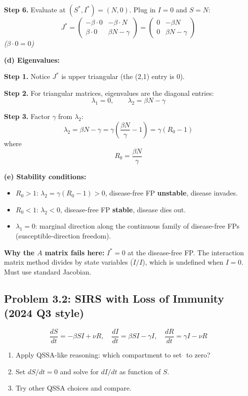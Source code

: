 \documentclass[10pt]{article}
\newcommand{\stepwhy}[1]{\textcolor{blue!60!black}{\small\textit{(#1)}}}
\begin{document}
\begin{solution}
\textbf{Step 6.} Evaluate at $(S^*, I^*) = (N, 0)$. Plug in $I = 0$ and $S = N$:
\[
J^* = \begin{pmatrix} -\beta\cdot 0 & -\beta\cdot N \\ \beta\cdot 0 & \beta N - \gamma \end{pmatrix} = \begin{pmatrix} 0 & -\beta N \\ 0 & \beta N - \gamma \end{pmatrix}
\]
\stepwhy{$\beta\cdot 0 = 0$}

\medskip\textbf{(d) Eigenvalues:}

\textbf{Step 1.} Notice $J^*$ is upper triangular (the (2,1) entry is 0).

\textbf{Step 2.} For triangular matrices, eigenvalues are the diagonal entries:
\[
\lambda_1 = 0, \qquad \lambda_2 = \beta N - \gamma
\]

\textbf{Step 3.} Factor $\gamma$ from $\lambda_2$:
\[
\lambda_2 = \beta N - \gamma = \gamma\left(\frac{\beta N}{\gamma} - 1\right) = \gamma(R_0 - 1)
\]
where
\[
\boxed{R_0 = \frac{\beta N}{\gamma}}
\]

\medskip\textbf{(e) Stability conditions:}

\begin{itemize}
\item $R_0 > 1$: $\lambda_2 = \gamma(R_0-1) > 0$, disease-free FP \textbf{unstable}, disease invades.
\item $R_0 < 1$: $\lambda_2 < 0$, disease-free FP \textbf{stable}, disease dies out.
\item $\lambda_1 = 0$: marginal direction along the continuous family of disease-free FPs (susceptible-direction freedom).
\end{itemize}

\textbf{Why the $A$ matrix fails here:} $I^* = 0$ at the disease-free FP. The interaction matrix method divides by state variables ($\dot I/I$), which is undefined when $I = 0$. Must use standard Jacobian.
\end{solution}

\subsection{Problem 3.2: SIRS with Loss of Immunity (2024 Q3 style)}

\begin{problem}
\[
\frac{dS}{dt} = -\beta SI + \nu R, \quad \frac{dI}{dt} = \beta SI - \gamma I, \quad \frac{dR}{dt} = \gamma I - \nu R
\]
\begin{enumerate}[label=(\alph*)]
\item Apply QSSA-like reasoning: which compartment to set $\dot{}$ to zero?
\item Set $dS/dt = 0$ and solve for $dI/dt$ as function of $S$.
\item Try other QSSA choices and compare.
\end{enumerate}
\end{problem}
\end{document}
